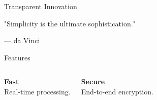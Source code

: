 \documentclass[theme=business, aspectratio=169]{Hypo-Slide}
\begin{document}
\frame{\titlepage}

\begin{frame}{Transparent Innovation}
  \begin{tcolorbox}
    \Huge
    "Simplicity is the ultimate sophistication."
    
    \hfill \large --- da Vinci
  \end{tcolorbox}
\end{frame}

\begin{frame}{Features}
   \begin{columns}
       \begin{tcolorbox}
         \textbf{Fast} \\
         Real-time processing.
       \end{tcolorbox}
       \begin{tcolorbox}
         \textbf{Secure} \\
         End-to-end encryption.
       \end{tcolorbox}
   \end{columns}
\end{frame}
\end{document}
